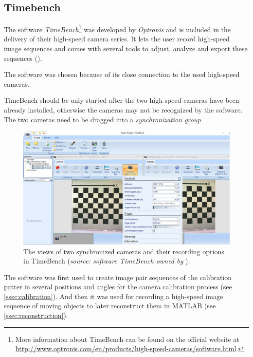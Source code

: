 \subsection{Timebench} \label{ssec:Timebench}
The software \textit{TimeBench}\footnote{More information about TimeBench can be found on the official website at \url{http://www.optronis.com/en/products/high-speed-cameras/software.html}.} was developed by \textit{Optronis} and is included in the delivery of their high-speed camera series. It lets the user record high-speed image sequences and comes with several tools to adjust, analyze and export these sequences (\cite{Optronis.2016}). 

The software was chosen because of its close connection to the used high-speed cameras.

TimeBench should be only started after the two high-speed cameras have been already installed, otherwise the cameras may not be recognized by the software. The two cameras need to be dragged into a \textit{synchronization group} 

\begin{figure}[htbp]
		\centering
		\includegraphics[width=1.0\textwidth]{figures/timebenchRecord}
		\caption[The views of two synchronized cameras and their recording options in TimeBench]{The views of two synchronized cameras and their recording options in TimeBench (\textit{source: software TimeBench owned by} \cite{Optronis.2016}).}
		\label{fig:timebanchRecord}
\end{figure}

The software was first used to create image pair sequences of the calibration patter in several positions and angles for the camera calibration process (see \autoref{ssec:calibration}). And then it was used for recording a high-speed image sequence of moving objects to later reconstruct them in MATLAB (see \autoref{ssec:reconstruction}). 
\\

